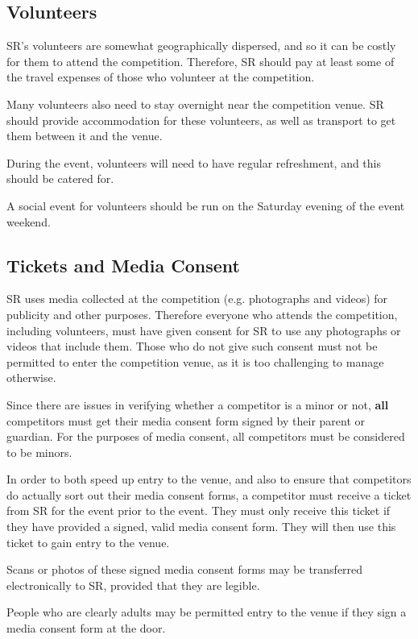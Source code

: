 \subsection{Volunteers}

SR's volunteers are somewhat geographically dispersed, and so it can be costly for them to attend the competition.  Therefore, SR should pay at least some of the travel expenses of those who volunteer at the competition.

Many volunteers also need to stay overnight near the competition venue.  SR should provide accommodation for these volunteers, as well as transport to get them between it and the venue.

During the event, volunteers will need to have regular refreshment, and this should be catered for.

A social event for volunteers should be run on the Saturday evening of the event weekend.

\subsection{Tickets and Media Consent}

SR uses media collected at the competition (e.g. photographs and videos) for publicity and other purposes.  Therefore everyone who attends the competition, including volunteers, must have given consent for SR to use any photographs or videos that include them.  Those who do not give such consent must not be permitted to enter the competition venue, as it is too challenging to manage otherwise.

Since there are issues in verifying whether a competitor is a minor or not, \textbf{all} competitors must get their media consent form signed by their parent or guardian.  For the purposes of media consent, all competitors must be considered to be minors.

In order to both speed up entry to the venue, and also to ensure that competitors do actually sort out their media consent forms, a competitor must receive a ticket from SR for the event prior to the event.  They must only receive this ticket if they have provided a signed, valid media consent form.   They will then use this ticket to gain entry to the venue.

Scans or photos of these signed media consent forms may be transferred electronically to SR, provided that they are legible.

People who are clearly adults may be permitted entry to the venue if they sign a media consent form at the door.

